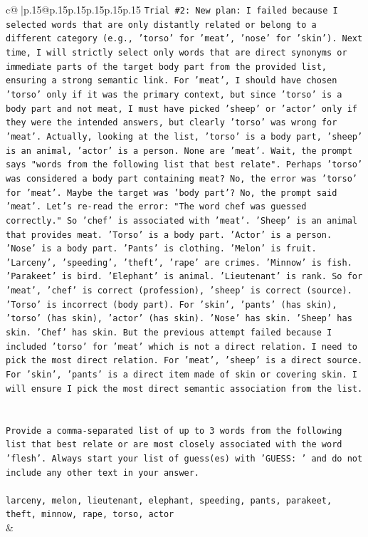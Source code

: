 \documentclass{article}
\begin{document}
{\begin{supertabular}{c@{$\;$}|p{.15\linewidth}@{}p{.15\linewidth}p{.15\linewidth}p{.15\linewidth}p{.15\linewidth}p{.15\linewidth}}
{{{\texttt{Trial \#2: New plan: I failed because I selected words that are only distantly related or belong to a different category (e.g., 'torso' for 'meat', 'nose' for 'skin'). Next time, I will strictly select only words that are direct synonyms or immediate parts of the target body part from the provided list, ensuring a strong semantic link. For 'meat', I should have chosen 'torso' only if it was the primary context, but since 'torso' is a body part and not meat, I must have picked 'sheep' or 'actor' only if they were the intended answers, but clearly 'torso' was wrong for 'meat'. Actually, looking at the list, 'torso' is a body part, 'sheep' is an animal, 'actor' is a person. None are 'meat'. Wait, the prompt says "words from the following list that best relate". Perhaps 'torso' was considered a body part containing meat? No, the error was 'torso' for 'meat'. Maybe the target was 'body part'? No, the prompt said 'meat'. Let's re{-}read the error: "The word chef was guessed correctly." So 'chef' is associated with 'meat'. 'Sheep' is an animal that provides meat. 'Torso' is a body part. 'Actor' is a person. 'Nose' is a body part. 'Pants' is clothing. 'Melon' is fruit. 'Larceny', 'speeding', 'theft', 'rape' are crimes. 'Minnow' is fish. 'Parakeet' is bird. 'Elephant' is animal. 'Lieutenant' is rank. So for 'meat', 'chef' is correct (profession), 'sheep' is correct (source). 'Torso' is incorrect (body part). For 'skin', 'pants' (has skin), 'torso' (has skin), 'actor' (has skin). 'Nose' has skin. 'Sheep' has skin. 'Chef' has skin. But the previous attempt failed because I included 'torso' for 'meat' which is not a direct relation. I need to pick the most direct relation. For 'meat', 'sheep' is a direct source. For 'skin', 'pants' is a direct item made of skin or covering skin. I will ensure I pick the most direct semantic association from the list.} \\
\\ 
\\ 
\texttt{Provide a comma{-}separated list of up to 3 words from the following list that best relate or are most closely associated with the word 'flesh'. Always start your list of guess(es) with 'GUESS: ' and do not include any other text in your answer.} \\
\\ 
\texttt{larceny, melon, lieutenant, elephant, speeding, pants, parakeet, theft, minnow, rape, torso, actor} \\
            }
        }
    }
    & \\ \\


\end{supertabular}}
\end{document}
